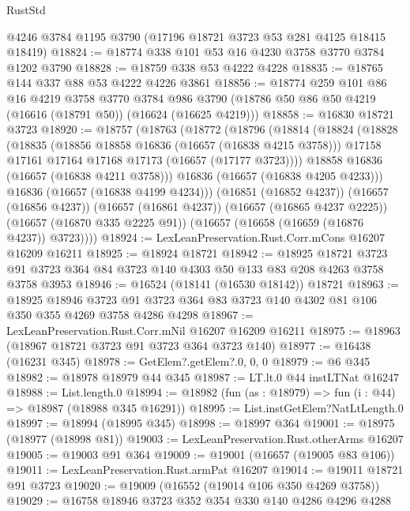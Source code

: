 \begin{lexlean}{RustStd}
\begin{coremodule}
    @4246
    @3784
    @1195
    @3790
    (@17196 @18721 @3723 @53 @281 @4125 @18415 @18419)
@18824 := @18774 @338 @101 @53 @16 @4230 @3758 @3770 @3784 @1202 @3790
@18828 := @18759 @338 @53 @4222 @4228
@18835 := @18765 @144 @337 @88 @53 @4222 @4226 @3861
@18856 := @18774
    @259
    @101
    @86
    @16
    @4219
    @3758
    @3770
    @3784
    @986
    @3790
    (@18786 @50 @86 @50 @4219 (@16616 (@18791 @50)) (@16624 (@16625 @4219)))
@18858 := @16830 @18721 @3723
@18920 := @18757
    (@18763
      (@18772
        (@18796
          (@18814
            (@18824
              (@18828
                (@18835
                  (@18856 @18858 @16836 (@16657 (@16838 @4215 @3758)))
                  @17158
                  @17161
                  @17164
                  @17168
                  @17173
                  (@16657 (@17177 @3723))))
              @18858
              @16836
              (@16657 (@16838 @4211 @3758)))
            @16836
            (@16657 (@16838 @4205 @4233)))
          @16836
          (@16657 (@16838 @4199 @4234)))
        (@16851 (@16852 @4237))
        (@16657 (@16856 @4237))
        (@16657 (@16861 @4237))
        (@16657 (@16865 @4237 @2225))
        (@16657 (@16870 @335 @2225 @91))
        (@16657 (@16658 (@16659 (@16876 @4237)) @3723))))
@18924 := LexLeanPreservation.Rust.Corr.mCons @16207 @16209 @16211
@18925 := @18924 @18721
@18942 := @18925
    @18721
    @3723
    @91
    @3723
    @364
    @84
    @3723
    @140
    @4303
    @50
    @133
    @83
    @208
    @4263
    @3758
    @3758
    @3953
@18946 := @16524 (@18141 (@16530 @18142)) @18721
@18963 := @18925
    @18946
    @3723
    @91
    @3723
    @364
    @83
    @3723
    @140
    @4302
    @81
    @106
    @350
    @355
    @4269
    @3758
    @4286
    @4298
@18967 := LexLeanPreservation.Rust.Corr.mNil @16207 @16209 @16211
@18975 := @18963 (@18967 @18721 @3723 @91 @3723 @364 @3723 @140)
@18977 := @16438 (@16231 @345)
@18978 := GetElem?.getElem?.{0, 0, 0}
@18979 := @6 @345
@18982 := @18978 @18979 @44 @345
@18987 := LT.lt.{0} @44 instLTNat @16247
@18988 := List.length.{0}
@18994 := @18982 (fun (as : @18979) => fun (i : @44) => @18987 (@18988 @345 @16291))
@18995 := List.instGetElem?NatLtLength.{0}
@18997 := @18994 (@18995 @345)
@18998 := @18997 @364
@19001 := @18975 (@18977 (@18998 @81))
@19003 := LexLeanPreservation.Rust.otherArms @16207
@19005 := @19003 @91 @364
@19009 := @19001 (@16657 (@19005 @83 @106))
@19011 := LexLeanPreservation.Rust.armPat @16207
@19014 := @19011 @18721 @91 @3723
@19020 := @19009 (@16552 (@19014 @106 @350 @4269 @3758))
@19029 := @16758 @18946 @3723 @352 @354 @330 @140 @4286 @4296 @4288

\end{coremodule}
\end{lexlean}

